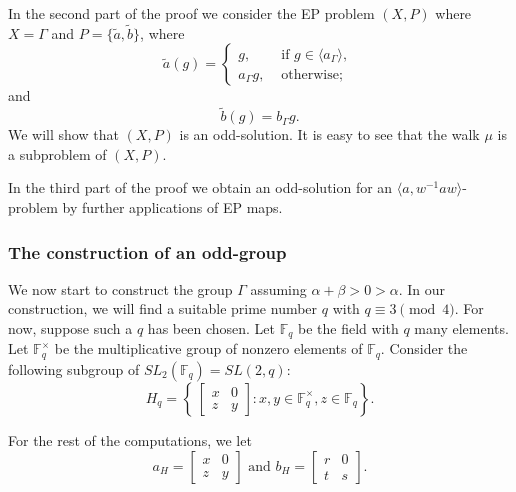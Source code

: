 \documentclass[11pt]{amsart}
\theoremstyle{definition}
\theoremstyle{definition}
\numberwithin{equation}{section}
\begin{document}
In the second part of the proof we consider the EP problem $(X, P)$ where $X=\Gamma$ and $P=\{\tilde{a}, \tilde{b}\}$, where
$$ \tilde{a}(g)=\left\{\begin{array}{ll} g, & \mbox{ if $g\in \langle a_\Gamma\rangle$, }\\
a_\Gamma g, & \mbox{ otherwise;}
\end{array}\right. $$
and 
$$ \tilde{b}(g)=b_\Gamma g. $$
We will show that $(X, P)$ is an odd-solution. It is easy to see that the walk $\mu$ is a subproblem of $(X,P)$. 

In the third part of the proof we obtain an odd-solution for an $\langle a, w^{-1}aw\rangle$-problem by further applications of EP maps. 








\subsubsection{The construction of an odd-group}

We now start to construct the group $\Gamma$ assuming $\alpha+\beta>0>\alpha$. In our construction, we will find a suitable prime number $q$ with $q\equiv 3 \pmod 4$. For now, suppose such a $q$ has been chosen. 
Let $\mathbb{F}_q$ be the field with $q$ many elements. Let $\mathbb{F}_q^\times$ be the multiplicative group of nonzero elements of $\mathbb{F}_q$. Consider the following subgroup of $SL_2(\mathbb{F}_q)=SL(2,q)$:
$$ H_q=\left\{\ \left[\begin{array}{cc} x & 0 \\ z & y\end{array}\right] \colon x,y\in \mathbb{F}_q^\times, z\in \mathbb{F}_q\right\}. $$

For the rest of the computations, we let
\begin{equation}\label{eqn:abH} a_H=\left[\begin{array}{cc} x& 0 \\ z & y\end{array}\right] \mbox{ and } b_H=\left[\begin{array}{cc} r & 0 \\ t & s\end{array}\right]. \end{equation}
\end{document}
